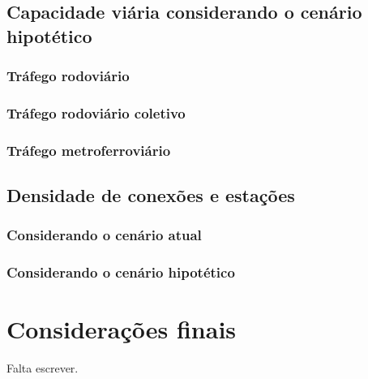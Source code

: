 \documentclass[
article,			%
11pt,				%
oneside,			%
a4paper,			%
english,			%
brazil,				%
sumario=tradicional
]{abntex2}
\begin{document}
	\subsection{Capacidade viária considerando o cenário hipotético} \label{s2:capacidadefuturo}
	
	\subsubsection{Tráfego rodoviário} \label{s3:rodofuturo}
	
	\subsubsection{Tráfego rodoviário coletivo} \label{s3:coletivofuturo}
	
	\subsubsection{Tráfego metroferroviário} \label{s3:metrofuturo}
	
	\subsection{Densidade de conexões e estações} \label{s2:densidadeconexoes}
	
	\subsubsection{Considerando o cenário atual} \label{s3:densidadeatual}
	
	\subsubsection{Considerando o cenário hipotético} \label{s3:densidadefuturo}
	
	
	\section*{Considerações finais}
	
	Falta escrever.
	
	\postextual
	
\end{document}
